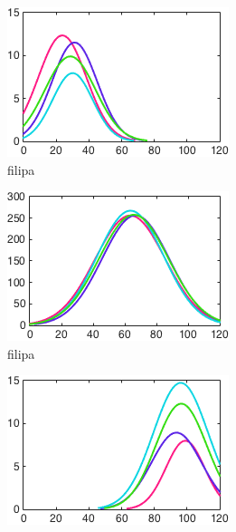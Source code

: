 \begin{figure}[h]
        \centering
        \begin{subfigure}[h]{0.32\textwidth}
                \includegraphics[width=\textwidth]{./img/4/FGHIhard}
                \caption{filipa}
                \label{fig:FGHIhard}
        \end{subfigure}
        \begin{subfigure}[h]{0.32\textwidth}
                \includegraphics[width=\textwidth]{./img/4/FGHImedium}
                \caption{filipa}
                \label{fig:FGHImedium}
        \end{subfigure}
        \begin{subfigure}[h]{0.32\textwidth}
                \includegraphics[width=\textwidth]{./img/4/FGHIeasy}

\end{subfigure}
\end{figure}
